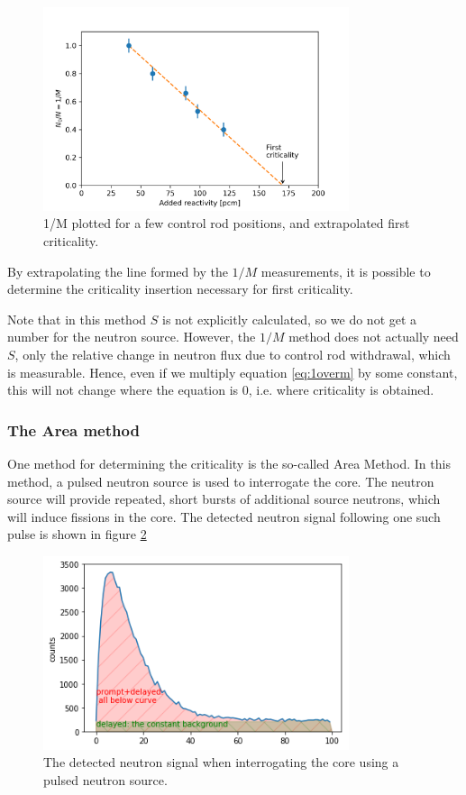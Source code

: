 \begin{figure} 
\centering
\includegraphics[width=0.8\textwidth]{figures/04-1overM_plot.png}
\caption[Area Method]{\label{fig:1overm_plot}
1/M plotted for a few control rod positions, and extrapolated first criticality.}
\end{figure}

By extrapolating the line formed by the $1/M$ measurements, it is possible to determine the criticality insertion necessary for first criticality. 

Note that in this method $S$ is not explicitly calculated, so we do not get a number for the neutron source. However, the $1/M$ method does not actually need $S$, only the relative change in neutron flux due to control rod withdrawal, which is measurable. Hence, even if we multiply equation \ref{eq:1overm} by some constant, this will not change where the equation is 0, i.e. where criticality is obtained.

\subsubsection{The Area method}

One method for determining the criticality is the so-called Area Method. In this method, a pulsed neutron source is used to interrogate the core. The neutron source will provide repeated, short bursts of additional source neutrons, which will induce fissions in the core. The detected neutron signal following one such pulse is shown in figure \ref{fig:area_method}

\begin{figure} 
\centering
\includegraphics[width=0.8\textwidth]{figures/Area_method.png}
\caption[Area Method]{\label{fig:area_method}
The detected neutron signal when interrogating the core using a pulsed neutron source.}
\end{figure}

